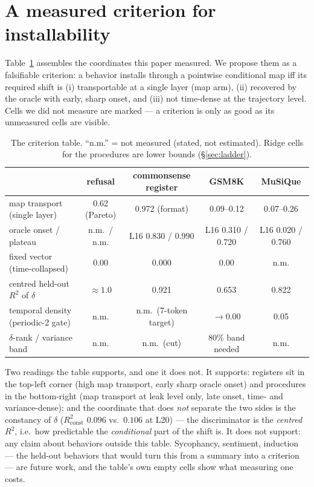 \documentclass{article}
\begin{document}
\section{A measured criterion for installability}
\label{sec:criterion}

Table~\ref{tab:criterion} assembles the coordinates this paper measured. We propose them as a
falsifiable criterion: a behavior installs through a pointwise conditional map iff its required
shift is (i) transportable at a single layer (map arm), (ii) recovered by the oracle with early,
sharp onset, and (iii) not time-dense at the trajectory level. Cells we did not measure are marked
--- a criterion is only as good as its unmeasured cells are visible.

\begin{table}[t]
\centering
\caption{The criterion table. ``n.m.'' = not measured (stated, not estimated). Ridge cells for the
procedures are lower bounds (\S\ref{sec:ladder}).
}
\label{tab:criterion}
\small
\setlength{\tabcolsep}{4pt}
\begin{tabular}{lcccc}
\toprule
 & refusal & commonsense register & GSM8K & MuSiQue \\
\midrule
map transport (single layer) & 0.62 (Pareto) & 0.972 (format) & 0.09--0.12 & 0.07--0.26 \\
oracle onset / plateau & n.m.\ / n.m. & L16 0.830 / 0.990 & L16 0.310 / 0.720 & L16 0.020 / 0.760 \\
fixed vector (time-collapsed) & 0.00 & 0.000 & 0.00 & n.m. \\
centred held-out $R^2$ of $\delta$ & ${\approx}1.0$ & 0.921 & 0.653 & 0.822 \\
temporal density (periodic-2 gate) & n.m. & n.m.\ (7-token target) & ${\to}0.00$ & 0.05 \\
$\delta$-rank / variance band & n.m. & n.m.\ (cut) & 80\% band needed & n.m. \\
\bottomrule
\end{tabular}
\end{table}

Two readings the table supports, and one it does not. It supports: registers sit in the
top-left corner (high map transport, early sharp oracle onset) and procedures in the bottom-right
(map transport at leak level only, late onset, time- and variance-dense); and the coordinate that
does \emph{not} separate the two sides is the constancy of $\delta$ ($R^2_{\mathrm{const}}$
$0.096$ vs.\ $0.106$ at L20) --- the discriminator is the \emph{centred} $R^2$, i.e.\ how
predictable the \emph{conditional} part of the shift is. It does not support: any claim about
behaviors outside this table. Sycophancy, sentiment, induction --- the held-out behaviors that
would turn this from a summary into a criterion --- are future work, and the table's own empty
cells show what measuring one costs.
\end{document}
